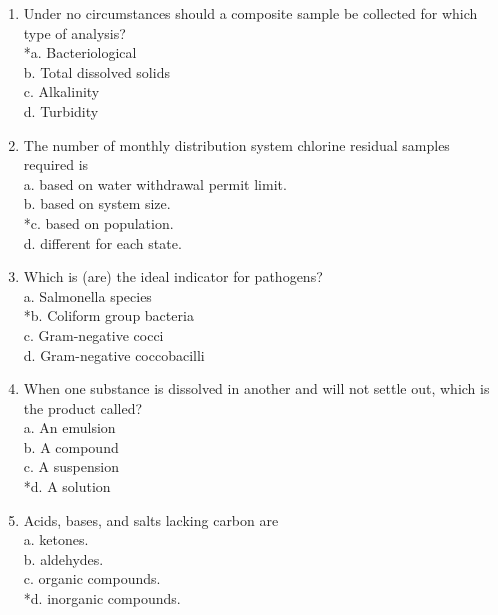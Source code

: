 \begin{enumerate}[1.]
 \item Under no circumstances should a composite sample be collected for which type of analysis?\\
*a. Bacteriological\\
b. Total dissolved solids\\
c. Alkalinity\\
d. Turbidity\\
  \item The number of monthly distribution system chlorine residual samples required is\\
a. based on water withdrawal permit limit.\\
b. based on system size.\\
*c. based on population.\\
d. different for each state.\\
  \item Which is (are) the ideal indicator for pathogens?\\
a. Salmonella species\\
*b. Coliform group bacteria\\
c. Gram-negative cocci\\
d. Gram-negative coccobacilli\\
  \item When one substance is dissolved in another and will not settle out, which is the product called?\\
a. An emulsion\\
b. A compound\\
c. A suspension\\
*d. A solution 

\item Acids, bases, and salts lacking carbon are\\
a. ketones.\\
b. aldehydes.\\
c. organic compounds.\\
*d. inorganic compounds.\\


\end{enumerate}
